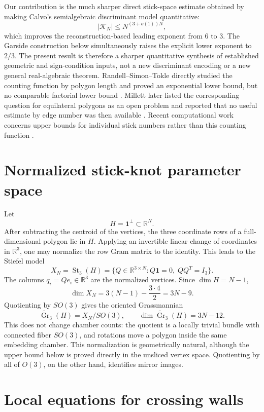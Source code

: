 \documentclass[11pt]{article}
\theoremstyle{remark}
\theoremstyle{plain}
\newcommand{\R}{\mathbb{R}}
\newcommand{\Kcal}{\mathcal{K}}
\DeclareMathOperator{\Gr}{Gr}
\DeclareMathOperator{\St}{St}
\begin{document}
Our contribution is the much sharper direct stick-space estimate obtained by
making Calvo's semialgebraic discriminant model quantitative:
\[
 |\Kcal_N|\le N^{(3+o(1))N},
\]
which improves the reconstruction-based leading exponent from \(6\) to \(3\).
The Garside construction below simultaneously raises the explicit lower
exponent to \(2/3\).  The present result is therefore a sharper quantitative
synthesis of established geometric and sign-condition inputs, not a new
discriminant encoding or a new general real-algebraic theorem.
Randell--Simon--Tokle directly studied the counting
function by polygon length and proved an exponential lower bound, but no
comparable factorial lower bound \cite{RandellSimonTokle}.  Millett later
listed the corresponding question for equilateral polygons as an open problem
and reported that no useful estimate by edge number was then available
\cite[Problem 5.2]{MillettPhysical}.  Recent computational work concerns upper
bounds for individual stick numbers rather than this counting function
\cite{CantarellaEtAl2025}.
\section{Normalized stick-knot parameter space}

Let
\[
    H=\mathbf{1}^{\perp}\subset\R^N.
\]
After subtracting the centroid of the vertices, the three coordinate rows of a
full-dimensional polygon lie in \(H\).  Applying an invertible linear change of
coordinates in \(\R^3\), one may normalize the row Gram matrix to the identity.
This leads to the Stiefel model
\[
    X_N=\St_3(H)
    =
    \{Q\in\R^{3\times N}: Q\mathbf{1}=0,\; QQ^T=I_3\}.
\]
The columns \(q_i=Qe_i\in\R^3\) are the normalized vertices.  Since
\(\dim H=N-1\),
\[
    \dim X_N
    =
    3(N-1)-\frac{3\cdot4}{2}
    =
    3N-9.
\]
Quotienting by \(SO(3)\) gives the oriented Grassmannian
\[
    \widetilde{\Gr}_3(H)=X_N/SO(3),
    \qquad
    \dim \widetilde{\Gr}_3(H)=3N-12.
\]
This does not change chamber counts: the quotient is a locally trivial bundle
with connected fiber \(SO(3)\), and rotations move a polygon inside the same
embedding chamber.  This normalization is geometrically natural, although the
upper bound below is proved directly in the unsliced vertex space.
Quotienting by all of \(O(3)\), on the other hand, identifies mirror images.

\section{Local equations for crossing walls}
\end{document}
